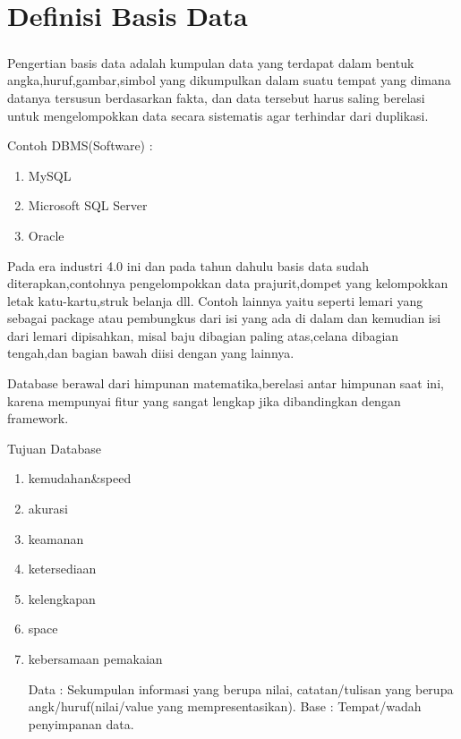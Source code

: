 \chapter{Definisi Basis Data}

\paragraph{} Pengertian basis data adalah kumpulan data yang terdapat dalam bentuk angka,huruf,gambar,simbol yang dikumpulkan dalam suatu tempat yang dimana datanya tersusun berdasarkan
fakta, dan data tersebut harus saling berelasi untuk mengelompokkan data secara sistematis agar terhindar dari duplikasi.

Contoh DBMS(Software) :
\begin{enumerate}
    \item MySQL
    \item Microsoft SQL Server
    \item Oracle
\end{enumerate}
  \par Pada era industri 4.0 ini dan pada tahun dahulu basis data sudah diterapkan,contohnya pengelompokkan data prajurit,dompet yang kelompokkan letak katu-kartu,struk belanja dll. Contoh lainnya yaitu seperti lemari yang sebagai package atau pembungkus dari isi yang ada di dalam dan kemudian isi dari lemari dipisahkan, misal baju dibagian paling atas,celana dibagian tengah,dan bagian bawah diisi dengan yang lainnya.
  
\par Database berawal dari himpunan matematika,berelasi antar himpunan saat ini, karena mempunyai fitur yang sangat lengkap jika dibandingkan dengan framework.

Tujuan Database
\begin{enumerate}
    \item kemudahan&speed
    \item akurasi
    \item keamanan
    \item ketersediaan
    \item kelengkapan
    \item space
    \item kebersamaan pemakaian

Data : Sekumpulan informasi yang berupa nilai, catatan/tulisan yang berupa angk/huruf(nilai/value yang mempresentasikan).
Base : Tempat/wadah penyimpanan data.
\end{enumerate}